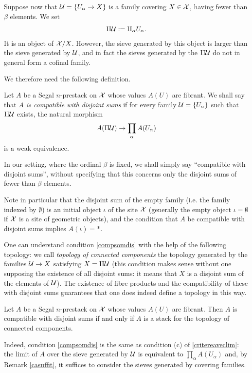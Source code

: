 Suppose now that ${\cal U} = \{ U_{\alpha}\rightarrow X\}$ is a family covering
$X\in {\cal X}$, having fewer than $\beta$ elements. We set
$$
\amalg {\cal U} :=
\amalg _{\alpha} U_{\alpha}.
$$
It is an object of ${\cal X} /X$. However, the sieve generated by this object is
larger than the sieve generated by ${\cal U}$, and in fact the sieves generated by
the $\amalg {\cal U}$ do not in general form a cofinal family.

We therefore need the following definition.

\begin{definition}
\label{compsomdis}
Let $A$ be a Segal $n$-prestack on ${\cal X}$ whose values $A(U)$ are fibrant.
We shall say that {\em $A$ is compatible with disjoint sums} if for every family
${\cal U} = \{ U_{\alpha} \}$ such that $\amalg {\cal U}$ exists, the natural morphism
$$
A(\amalg {\cal U} )\rightarrow \prod _{\alpha} A(U_{\alpha})
$$
is a weak equivalence.
\end{definition}

In our setting, where the ordinal $\beta$ is fixed, we shall simply say
``compatible with disjoint sums'', without specifying that this concerns only
the disjoint sums of fewer than $\beta$ elements.

Note in particular that the disjoint sum of the empty family (i.e. the family
indexed by $\emptyset$) is an initial object $\iota$ of the site ${\cal X}$
(generally the empty object $\iota = \emptyset$ if ${\cal X}$ is a site of geometric
objects), and the condition that $A$ be compatible with disjoint sums implies
$A(\iota )= \ast$.

One can understand condition \ref{compsomdis} with the help of the following
topology: we call {\em topology of connected components} the topology generated
by the families ${\cal U} \rightarrow X$ satisfying $X=\amalg {\cal U}$ (this condition
makes sense without one supposing the existence of all disjoint sums: it means
that $X$ is a disjoint sum of the elements of ${\cal U}$). The existence of fibre
products and the compatibility of these with disjoint sums guarantees that one
does indeed define a topology in this way.

\begin{remark}
\label{topcompcon}
Let $A$ be a Segal $n$-prestack on ${\cal X}$ whose values $A(U)$ are fibrant.
Then $A$ is compatible with disjoint sums if and only if $A$ is a stack for the
topology of connected components.
\end{remark}

Indeed, condition \ref{compsomdis} is the same as condition (c) of
\ref{critereaveclim}: the limit of $A$ over the sieve generated by ${\cal U}$ is
equivalent to $\prod _{\alpha} A(U_{\alpha})$ and, by Remark \ref{casuffit}, it
suffices to consider the sieves generated by covering families.

